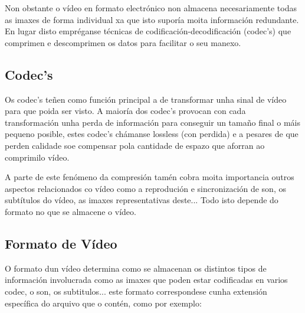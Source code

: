     Non obstante o vídeo en formato electrónico non almacena necesariamente todas as imaxes de forma
    individual xa que isto suporía moita información redundante. En lugar disto empréganse técnicas
    de codificación-decodificación (codec's) que comprimen e descomprimen os datos para facilitar o
    seu manexo.

    \subsection{Codec's}
        Os codec's teñen como función principal a de transformar unha sinal de vídeo para que poida
        ser visto. A maioría dos codec's provocan con cada transformación unha perda de información
        para conseguir un tamaño final o máis pequeno posible, estes codec's chámanse lossless (con 
        perdida) e a pesares de que perden calidade soe compensar pola cantidade de espazo que 
        aforran ao comprimilo vídeo.
        
        A parte de este fenómeno da compresión tamén cobra moita importancia outros aspectos 
        relacionados co vídeo como a reprodución e sincronización de son, os subtítulos do vídeo,
        as imaxes representativas deste... Todo isto depende do formato no que se almacene o vídeo.
        
    \subsection{Formato de Vídeo}
        O formato dun vídeo determina como se almacenan os distintos tipos de información involucrada
        como as imaxes que poden estar codificadas en varios codec, o son, os subtitulos...
        este formato correspondese cunha extensión específica do arquivo que o contén, como por 
        exemplo:
        
